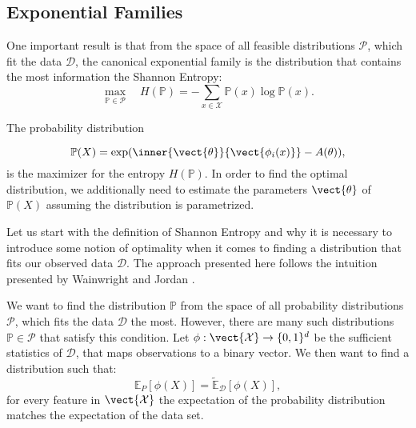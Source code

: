     
    \subsection{Exponential Families}
    \label{ssec:expf}
    One important result is that from the space of all feasible distributions $\mathcal{P}$, which fit the data $\mathcal{D}$, the canonical exponential family is the distribution that contains the most information \wrt the Shannon Entropy:
    \begin{equation}
    \max_{\mathbb{P}\in \mathcal{P}} \quad  H(\mathbb{P}) = - \sum_{x\in\mathcal{X}} \mathbb{P}(x) \log \mathbb{P}(x).
    \end{equation}

    The probability distribution

    \begin{equation}
        \mathbb{P}(X) = \exp(\inner{\vect{\theta}}{\vect{\phi_i(x)}} - A(\theta)),
    \end{equation}
    is the maximizer for the entropy $H(\mathbb{P})$.
    In order to find the optimal distribution, we additionally need to estimate the parameters $\vect{\theta}$ of $\mathbb{P}(X)$ assuming the distribution is parametrized.

    Let us start with the definition of Shannon Entropy and why it is necessary to introduce some notion of optimality when it comes to finding a distribution that fits our observed data $\mathcal{D}$.
    The approach presented here follows the intuition presented by Wainwright and Jordan \cite{wainwright2008graphical}.

    We want to find the distribution $\mathbb{P}$ from the space of all probability distributions $\mathcal{P}$, which fits the data  $\mathcal{D}$ the most.
    However, there are many such distributions $\mathbb{P} \in \mathcal{P}$ that satisfy this condition. 
    Let $\phi: \vect{\mathcal{X}}  \rightarrow \{0,1\}^d$ be the sufficient statistics of $\mathcal{D}$, that maps observations to a binary vector. 
    We then want to find a distribution such that:
    \begin{equation}
        \label{eq:expecval}
        \mathbb{E}_P[\phi(X)] = \tilde{\mathbb{E}}_{\mathcal{D}}[\phi(X)], 
    \end{equation}
    for every feature in $\vect{\mathcal{X}}$ the expectation of the probability distribution matches the expectation of the data set.

